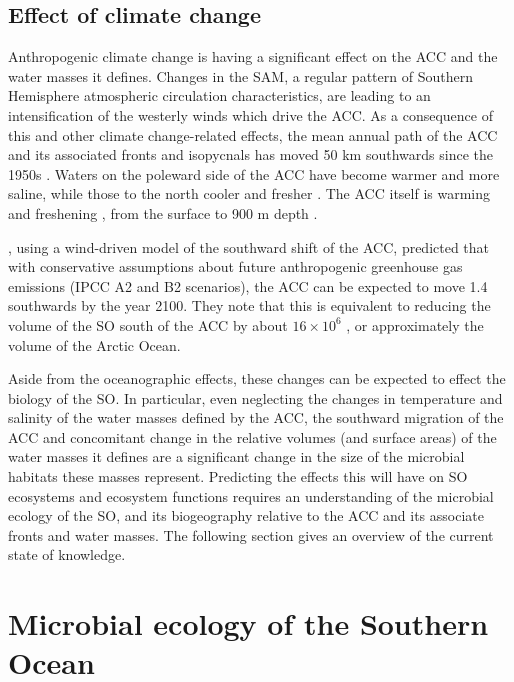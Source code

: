 \subsection{Effect of climate change}

Anthropogenic climate change is having a significant effect on the \ac{ACC} and the water masses it defines.
Changes in the \ac{SAM}, a regular pattern of Southern Hemisphere atmospheric circulation characteristics, are leading to an intensification of the westerly winds \cite{Thompson:2002ic} which drive the \ac{ACC}.
As a consequence of this and other climate change-related effects, the mean annual path of the \ac{ACC} and its associated fronts and isopycnals has moved \textapprox{} 50 km southwards since the 1950s \cite{Gille:2002fr}.
Waters on the poleward side of the \ac{ACC} have become warmer and more saline, while those to the north cooler and fresher \cite{Boning:2008il}.
The \ac{ACC} itself is warming and freshening \cite{Boning:2008il}, from the surface to 900 m depth \cite{Aoki:2003fo}.

\citet{Fyfe:2005vp}, using a wind-driven model of the southward shift of the \ac{ACC}, predicted that with conservative assumptions about future anthropogenic greenhouse gas emissions (\ac{IPCC} A2 and B2 scenarios), the \ac{ACC} can be expected to move \textapprox{} 1.4\textdegree{} southwards by the year 2100.
They note that this is equivalent to reducing the volume of the \ac{SO} south of the \ac{ACC} by about $16 \times{} 10^{6}$ , or approximately the volume of the Arctic Ocean.

Aside from the oceanographic effects, these changes can be expected to effect the biology of the \ac{SO}.
In particular, even neglecting the changes in temperature and salinity of the water masses defined by the \ac{ACC}, the southward migration of the \ac{ACC} and concomitant change in the relative volumes (and surface areas) of the water masses it defines are a significant change in the size of the microbial habitats these masses represent.
Predicting the effects this will have on \ac{SO} ecosystems and ecosystem functions requires an understanding of the microbial ecology of the \ac{SO}, and its biogeography relative to the \ac{ACC} and its associate fronts and water masses.
The following section gives an overview of the current state of knowledge.

\section{Microbial ecology of the Southern Ocean}

